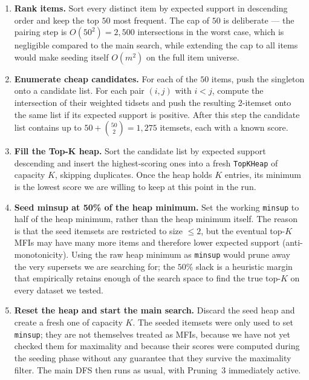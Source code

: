 \documentclass[12pt,a4paper]{report}
\begin{document}
  \begin{enumerate}
    \item \textbf{Rank items.} Sort every distinct item by expected support in descending order and keep the top $50$ most frequent. The cap of $50$ is deliberate --- the pairing step is $O(50^2) = 2{,}500$ intersections in the worst case, which is negligible compared to the main search, while extending the cap to all items would make seeding itself $O(m^2)$ on the full item universe.
    \item \textbf{Enumerate cheap candidates.} For each of the $50$ items, push the singleton onto a candidate list. For each pair $(i,j)$ with $i<j$, compute the intersection of their weighted tidsets and push the resulting 2-itemset onto the same list if its expected support is positive. After this step the candidate list contains up to $50 + \binom{50}{2} = 1{,}275$ itemsets, each with a known score.
    \item \textbf{Fill the Top-K heap.} Sort the candidate list by expected support descending and insert the highest-scoring ones into a fresh \texttt{TopKHeap} of capacity $K$, skipping duplicates. Once the heap holds $K$ entries, its minimum is the lowest score we are willing to keep at this point in the run.
    \item \textbf{Seed minsup at 50\% of the heap minimum.} Set the working \texttt{minsup} to half of the heap minimum, rather than the heap minimum itself. The reason is that the seed itemsets are restricted to size $\leq 2$, but the eventual top-$K$ MFIs may have many more items and therefore lower expected support (anti-monotonicity). Using the raw heap minimum as \texttt{minsup} would prune away the very supersets we are searching for; the $50\%$ slack is a heuristic margin that empirically retains enough of the search space to find the true top-$K$ on every dataset we tested.
    \item \textbf{Reset the heap and start the main search.} Discard the seed heap and create a fresh one of capacity $K$. The seeded itemsets were only used to set \texttt{minsup}; they are not themselves treated as MFIs, because we have not yet checked them for maximality and because their scores were computed during the seeding phase without any guarantee that they survive the maximality filter. The main DFS then runs as usual, with Pruning~3 immediately active.
  \end{enumerate}
\end{document}
